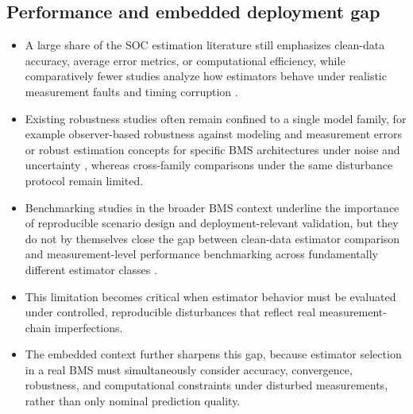 \documentclass[review]{elsarticle}
\begin{document}
\subsection{Performance and embedded deployment gap}
\begin{itemize}[leftmargin=*]
    \item A large share of the SOC estimation literature still emphasizes clean-data accuracy, average error metrics, or computational efficiency, while comparatively fewer studies analyze how estimators behave under realistic measurement faults and timing corruption \cite{shrivastavaReviewTechnologicalAdvancement2023,Embedded_AI_only_SOC_mobile,giazitzisCaseStudyTiny2024,mazziStateChargeEstimation2022}.
    \item Existing robustness studies often remain confined to a single model family, for example observer-based robustness against modeling and measurement errors \cite{liRobustnessSOCEstimation2015} or robust estimation concepts for specific BMS architectures under noise and uncertainty \cite{naseriReliableWirelessBMS2025}, whereas cross-family comparisons under the same disturbance protocol remain limited.
    \item Benchmarking studies in the broader BMS context underline the importance of reproducible scenario design and deployment-relevant validation, but they do not by themselves close the gap between clean-data estimator comparison and measurement-level performance benchmarking across fundamentally different estimator classes \cite{bergerBenchmarkingBatteryManagement2024}.
    \item This limitation becomes critical when estimator behavior must be evaluated under controlled, reproducible disturbances that reflect real measurement-chain imperfections.
    \item The embedded context further sharpens this gap, because estimator selection in a real BMS must simultaneously consider accuracy, convergence, robustness, and computational constraints under disturbed measurements, rather than only nominal prediction quality.
\end{itemize}
\end{document}

